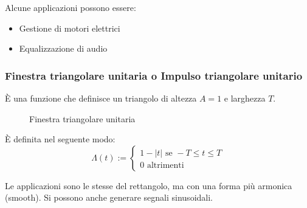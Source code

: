 \documentclass[a4paper]{article}
\begin{document}
\vspace{1em}
\noindent
Alcune applicazioni possono essere:
\begin{itemize}
  \item Gestione di motori elettrici
  \item Equalizzazione di audio
\end{itemize}

\subsubsection{Finestra triangolare unitaria o Impulso triangolare unitario}
È una funzione che definisce un triangolo di altezza \( A = 1 \) e larghezza \( T \).
\begin{figure}[H]
  \centering
  \caption{Finestra triangolare unitaria}
\end{figure}
\noindent
È definita nel seguente modo:
\[
\Lambda(t) := \begin{cases}
  1 - |t| \text{ se } -T \le t \le T\\
  0 \text{ altrimenti}
\end{cases}
\]

\vspace{1em}
\noindent
Le applicazioni sono le stesse del rettangolo, ma con una forma più armonica (smooth).
Si possono anche generare segnali sinusoidali.
\end{document}
